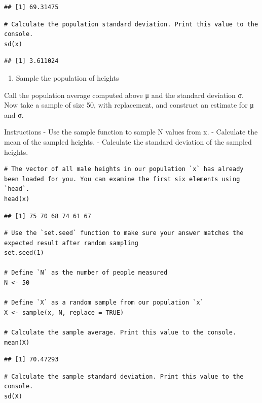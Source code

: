 \documentclass[
]{article}
\providecommand{\tightlist}{%
  \setlength{\itemsep}{0pt}\setlength{\parskip}{0pt}}
\begin{document}
\begin{verbatim}
## [1] 69.31475
\end{verbatim}

\begin{verbatim}
# Calculate the population standard deviation. Print this value to the console.
sd(x)
\end{verbatim}

\begin{verbatim}
## [1] 3.611024
\end{verbatim}

\begin{enumerate}
\def\labelenumi{\arabic{enumi}.}
\setcounter{enumi}{1}
\tightlist
\item
  Sample the population of heights
\end{enumerate}

Call the population average computed above μ and the standard deviation
σ. Now take a sample of size 50, with replacement, and construct an
estimate for μ and σ.

Instructions - Use the sample function to sample N values from x. -
Calculate the mean of the sampled heights. - Calculate the standard
deviation of the sampled heights.

\begin{verbatim}
# The vector of all male heights in our population `x` has already been loaded for you. You can examine the first six elements using `head`.
head(x)
\end{verbatim}

\begin{verbatim}
## [1] 75 70 68 74 61 67
\end{verbatim}

\begin{verbatim}
# Use the `set.seed` function to make sure your answer matches the expected result after random sampling
set.seed(1)

# Define `N` as the number of people measured
N <- 50

# Define `X` as a random sample from our population `x`
X <- sample(x, N, replace = TRUE)

# Calculate the sample average. Print this value to the console.
mean(X)
\end{verbatim}

\begin{verbatim}
## [1] 70.47293
\end{verbatim}

\begin{verbatim}
# Calculate the sample standard deviation. Print this value to the console.
sd(X)
\end{verbatim}
\end{document}
